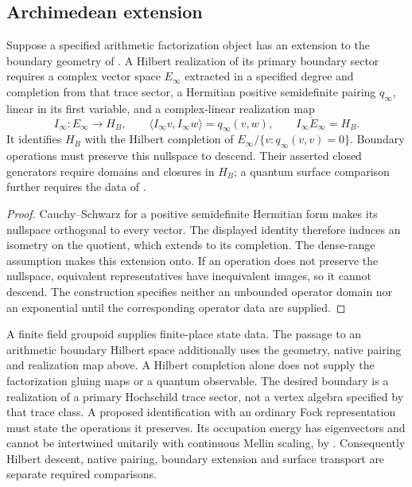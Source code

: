 \subsection{Archimedean extension}
\label{v4-arith:w10-a:CG-infty}

\begin{proposition}
\label{v4-arith:w10-a:prop:CG-infty-obstruction}
Suppose a specified arithmetic factorization object has an extension
to the boundary geometry of .
A Hilbert realization of its primary boundary sector requires a
complex vector space \(E_\infty\) extracted in a specified degree
and completion from that trace sector, a Hermitian positive
semidefinite pairing \(q_\infty\), linear in its first variable,
and a complex-linear realization map
\[
 I_\infty:E_\infty\to H_B,\qquad
 \langle I_\infty v,I_\infty w\rangle=q_\infty(v,w),
 \qquad\overline{I_\infty E_\infty}=H_B.
\]
It identifies \(H_B\) with the Hilbert completion of
\(E_\infty/\{v:q_\infty(v,v)=0\}\).
Boundary operations must preserve this nullspace to descend.
Their asserted closed generators require domains and closures in
\(H_B\); a quantum surface comparison further requires the data of
.
\end{proposition}
\begin{proof}
Cauchy--Schwarz for a positive semidefinite Hermitian form makes
its nullspace orthogonal to every vector. The displayed identity
therefore induces an isometry on the quotient, which extends to
its completion. The dense-range assumption makes this extension
onto. If an operation does not preserve the nullspace, equivalent
representatives have inequivalent images, so it cannot descend.
The construction specifies neither an unbounded operator domain nor
an exponential until the corresponding operator data are supplied.
\end{proof}

\begin{remark}
\label{v4-arith:w10-a:rem:construction-III-stop}
A finite field groupoid supplies finite-place state data. The passage
to an arithmetic boundary Hilbert space additionally uses the geometry,
native pairing and realization map above. A Hilbert completion alone
does not supply the factorization gluing maps or a quantum observable.
The desired boundary is a realization of a primary Hochschild trace
sector, not a vertex algebra specified by that trace class.
A proposed identification with an ordinary Fock representation must
state the operations it preserves. Its occupation energy has
eigenvectors and cannot be intertwined unitarily with continuous
Mellin scaling, by .
Consequently Hilbert descent, native pairing, boundary extension and
surface transport are separate required comparisons.
\end{remark}
